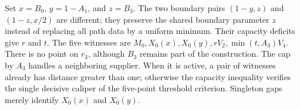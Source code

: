 Set $x=B_0$, $y=1-A_1$, and $z=B_3$. The two boundary pairs
$(1-y,z)$ and $(1-z,x/2)$ are different; they preserve the shared boundary
parameter $z$ instead of replacing all path data by a uniform minimum.
Their capacity deficits give $r$ and $t$. The five witnesses are
$M_0,X_0(x),X_0(y),rV_2,\min(t,A_3)V_4$.
There is no point on $r_3$, although $B_3$ remains part of the construction.
The cap by $A_3$ handles a neighboring supplier. When it is active,
a pair of witnesses already has distance greater than one; otherwise the capacity inequality verifies the single decisive caliper
of the five-point threshold criterion. Singleton gaps merely identify
$X_0(x)$ and $X_0(y)$.

